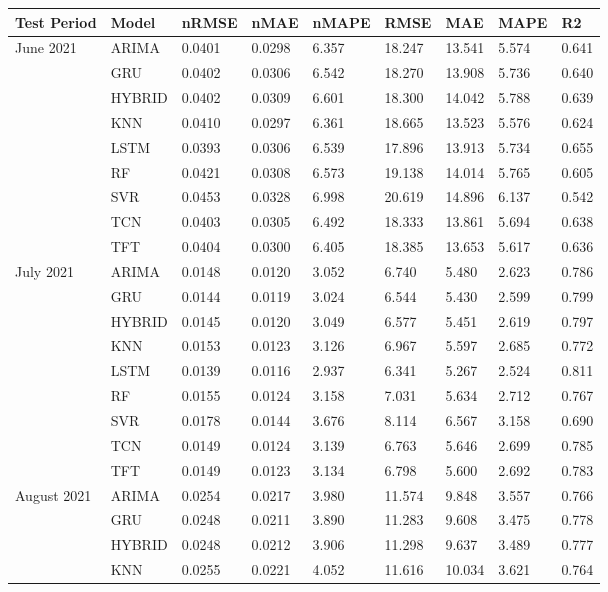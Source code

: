 \begin{tabular}{lllllllll}
\toprule
Test Period & Model & nRMSE & nMAE & nMAPE & RMSE & MAE & MAPE & R2 \\
\midrule
June 2021 & ARIMA & 0.0401 & 0.0298 & 6.357 & 18.247 & 13.541 & 5.574 & 0.641 \\
 & GRU & 0.0402 & 0.0306 & 6.542 & 18.270 & 13.908 & 5.736 & 0.640 \\
 & HYBRID & 0.0402 & 0.0309 & 6.601 & 18.300 & 14.042 & 5.788 & 0.639 \\
 & KNN & 0.0410 & 0.0297 & 6.361 & 18.665 & 13.523 & 5.576 & 0.624 \\
 & LSTM & 0.0393 & 0.0306 & 6.539 & 17.896 & 13.913 & 5.734 & 0.655 \\
 & RF & 0.0421 & 0.0308 & 6.573 & 19.138 & 14.014 & 5.765 & 0.605 \\
 & SVR & 0.0453 & 0.0328 & 6.998 & 20.619 & 14.896 & 6.137 & 0.542 \\
 & TCN & 0.0403 & 0.0305 & 6.492 & 18.333 & 13.861 & 5.694 & 0.638 \\
 & TFT & 0.0404 & 0.0300 & 6.405 & 18.385 & 13.653 & 5.617 & 0.636 \\
July 2021 & ARIMA & 0.0148 & 0.0120 & 3.052 & 6.740 & 5.480 & 2.623 & 0.786 \\
 & GRU & 0.0144 & 0.0119 & 3.024 & 6.544 & 5.430 & 2.599 & 0.799 \\
 & HYBRID & 0.0145 & 0.0120 & 3.049 & 6.577 & 5.451 & 2.619 & 0.797 \\
 & KNN & 0.0153 & 0.0123 & 3.126 & 6.967 & 5.597 & 2.685 & 0.772 \\
 & LSTM & 0.0139 & 0.0116 & 2.937 & 6.341 & 5.267 & 2.524 & 0.811 \\
 & RF & 0.0155 & 0.0124 & 3.158 & 7.031 & 5.634 & 2.712 & 0.767 \\
 & SVR & 0.0178 & 0.0144 & 3.676 & 8.114 & 6.567 & 3.158 & 0.690 \\
 & TCN & 0.0149 & 0.0124 & 3.139 & 6.763 & 5.646 & 2.699 & 0.785 \\
 & TFT & 0.0149 & 0.0123 & 3.134 & 6.798 & 5.600 & 2.692 & 0.783 \\
August 2021 & ARIMA & 0.0254 & 0.0217 & 3.980 & 11.574 & 9.848 & 3.557 & 0.766 \\
 & GRU & 0.0248 & 0.0211 & 3.890 & 11.283 & 9.608 & 3.475 & 0.778 \\
 & HYBRID & 0.0248 & 0.0212 & 3.906 & 11.298 & 9.637 & 3.489 & 0.777 \\
 & KNN & 0.0255 & 0.0221 & 4.052 & 11.616 & 10.034 & 3.621 & 0.764 \\

\end{tabular}

